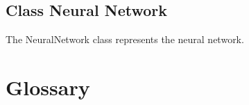 \documentclass[parskip=full]{scrartcl}
\begin{document}
\subsection{Class Neural Network}
The NeuralNetwork class represents the \gls{neural network}.


\newpage
\section{Glossary}

%
\printnoidxglossaries
\end{document}
